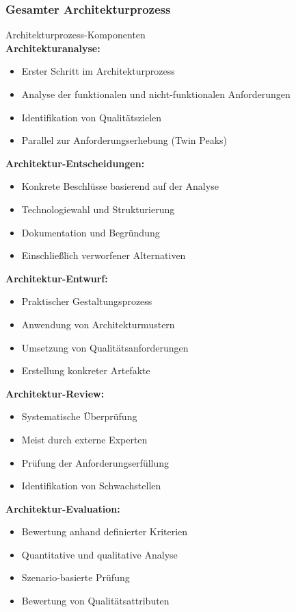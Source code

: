 \subsubsection{Gesamter Architekturprozess}

\begin{definition}{Architekturprozess-Komponenten}\\
\textbf{Architekturanalyse:}
\begin{itemize}
    \item Erster Schritt im Architekturprozess
    \item Analyse der funktionalen und nicht-funktionalen Anforderungen
    \item Identifikation von Qualitätszielen
    \item Parallel zur Anforderungserhebung (Twin Peaks)
\end{itemize}

\textbf{Architektur-Entscheidungen:}
\begin{itemize}
    \item Konkrete Beschlüsse basierend auf der Analyse
    \item Technologiewahl und Strukturierung
    \item Dokumentation und Begründung
    \item Einschließlich verworfener Alternativen
\end{itemize}

\textbf{Architektur-Entwurf:}
\begin{itemize}
    \item Praktischer Gestaltungsprozess
    \item Anwendung von Architekturmustern
    \item Umsetzung von Qualitätsanforderungen
    \item Erstellung konkreter Artefakte
\end{itemize}

\textbf{Architektur-Review:}
\begin{itemize}
    \item Systematische Überprüfung
    \item Meist durch externe Experten
    \item Prüfung der Anforderungserfüllung
    \item Identifikation von Schwachstellen
\end{itemize}

\textbf{Architektur-Evaluation:}
\begin{itemize}
    \item Bewertung anhand definierter Kriterien
    \item Quantitative und qualitative Analyse
    \item Szenario-basierte Prüfung
    \item Bewertung von Qualitätsattributen
\end{itemize}
\end{definition}


